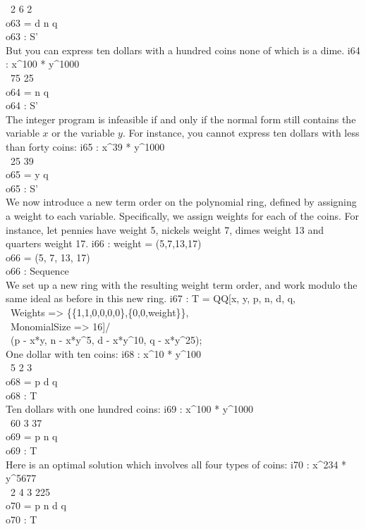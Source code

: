 \       2 6 2\\
o63 = d n q\\
\emptyLine
o63 : S'\\
\endOutput
But you can express ten dollars with a hundred coins none of which is a dime.
\beginOutput
i64 : x^100 * y^1000\\
\emptyLine
\       75 25\\
o64 = n  q\\
\emptyLine
o64 : S'\\
\endOutput
The integer program is infeasible if and only if the normal form still
contains the variable $x$ or the variable $y$. For instance, you cannot
express ten dollars with less than forty coins:
\beginOutput
i65 : x^39 * y^1000\\
\emptyLine
\       25 39\\
o65 = y  q\\
\emptyLine
o65 : S'\\
\endOutput
We now introduce a new term order on the polynomial ring, defined
by assigning a weight to each variable. Specifically, we assign
weights for each of the coins. For instance,
let pennies have weight 5, nickels weight 7, 
dimes weight 13 and quarters weight 17.
\beginOutput
i66 : weight = (5,7,13,17)\\
\emptyLine
o66 = (5, 7, 13, 17)\\
\emptyLine
o66 : Sequence\\
\endOutput
We set up a new ring with the resulting weight term order, and work modulo
the same ideal as before in this new ring.
\beginOutput
i67 : T = QQ[x, y, p, n, d, q, \\
\                Weights => \{\{1,1,0,0,0,0\},\{0,0,weight\}\},\\
\                MonomialSize => 16]/\\
\            (p - x*y, n - x*y^5, d - x*y^10, q - x*y^25);\\
\endOutput
One dollar with ten coins:
\beginOutput
i68 : x^10 * y^100\\
\emptyLine
\       5 2 3\\
o68 = p d q\\
\emptyLine
o68 : T\\
\endOutput
Ten dollars with one hundred coins:
\beginOutput
i69 : x^100 * y^1000\\
\emptyLine
\       60 3 37\\
o69 = p  n q\\
\emptyLine
o69 : T\\
\endOutput
Here is an optimal solution which involves all four types of coins:
\beginOutput
i70 : x^234 * y^5677\\
\emptyLine
\       2 4 3 225\\
o70 = p n d q\\
\emptyLine
o70 : T\\
\endOutput
